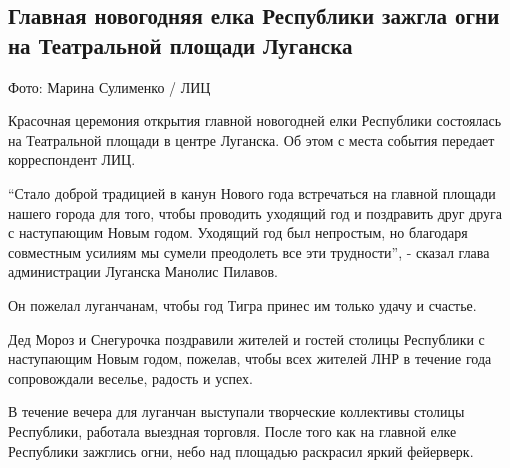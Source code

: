  
 
 
 
 
\subsection{Главная новогодняя елка Республики зажгла огни на Театральной площади Луганска}
\label{sec:24_12_2021.stz.news.lnr.lug_info.4.jolka}


Фото: Марина Сулименко / ЛИЦ

Красочная церемония открытия главной новогодней елки Республики состоялась на
Театральной площади в центре Луганска. Об этом с места события передает
корреспондент ЛИЦ.


\enquote{Стало доброй традицией в канун Нового года встречаться на главной площади
нашего города для того, чтобы проводить уходящий год и поздравить друг друга с
наступающим Новым годом. Уходящий год был непростым, но благодаря совместным
усилиям мы сумели преодолеть все эти трудности}, - сказал глава администрации
Луганска Манолис Пилавов.


Он пожелал луганчанам, чтобы год Тигра принес им только удачу и счастье.

Дед Мороз и Снегурочка поздравили жителей и гостей столицы Республики с
наступающим Новым годом, пожелав, чтобы всех жителей ЛНР в течение года
сопровождали веселье, радость и успех.


В течение вечера для луганчан выступали творческие коллективы столицы
Республики, работала выездная торговля. После того как на главной елке
Республики зажглись огни, небо над площадью раскрасил яркий фейерверк.

